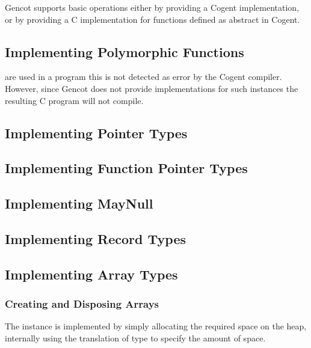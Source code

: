 Gencot supports basic operations either by providing a Cogent implementation, or by providing
a C implementation for functions defined as abstract in Cogent.

\subsection{Implementing Polymorphic Functions}
\label{impl-operations-poly}

are used in a program 
this is not detected as error by the Cogent compiler. However, since Gencot does not provide implementations for such
instances the resulting C program will not compile.

\subsection{Implementing Pointer Types}
\label{impl-operations-pointer}

\subsection{Implementing Function Pointer Types}
\label{impl-operations-function}

\subsection{Implementing MayNull}
\label{impl-operations-null}

\subsection{Implementing Record Types}
\label{impl-operations-record}

\subsection{Implementing Array Types}
\label{impl-operations-array}

\subsubsection{Creating and Disposing Arrays}

The  instance is implemented by simply allocating the
required space on the heap, internally using the translation of type  to specify
the amount of space. 

